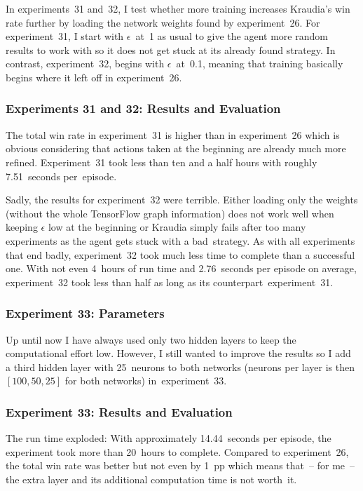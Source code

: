\documentclass[a4paper,titlepage]{article}
\begin{document}
In experiments~31 and~32, I test whether more training increases Kraudia's win rate further by loading the network weights found by experiment~26. For experiment~31, I start with $\epsilon$~at~1 as usual to give the agent more random results to work with so it does not get stuck at its already found strategy. In contrast, experiment~32, begins with $\epsilon$~at~0.1, meaning that training basically begins where it left off in experiment~26.

\subsubsection*{Experiments 31 and 32: Results and Evaluation}

The total win rate in experiment~31 is higher than in experiment~26 which is obvious considering that actions taken at the beginning are already much more refined. Experiment~31 took less than ten and a half hours with roughly 7.51~seconds per~episode.

Sadly, the results for experiment~32 were terrible. Either loading only the weights (without the whole TensorFlow graph information) does not work well when keeping $\epsilon$ low at the beginning or Kraudia simply fails after too many experiments as the agent gets stuck with a bad~strategy. As with all experiments that end badly, experiment~32 took much less time to complete than a successful one. With not even 4~hours of run time and 2.76~seconds per episode on average, experiment~32 took less than half as long as its counterpart~experiment~31.

\subsubsection*{Experiment 33: Parameters}

Up until now I have always used only two hidden layers to keep the computational effort low. However, I still wanted to improve the results so I add a third hidden layer with 25~neurons to both networks (neurons per layer is then $[100, 50, 25]$ for both networks) in~experiment~33.

\subsubsection*{Experiment 33: Results and Evaluation}

The run time exploded: With approximately 14.44~seconds per episode, the experiment took more than 20~hours to complete. Compared to experiment~26, the total win rate was better but not even by 1~pp which means that~-- for me~-- the extra layer and its additional computation time is not worth~it.
\end{document}
